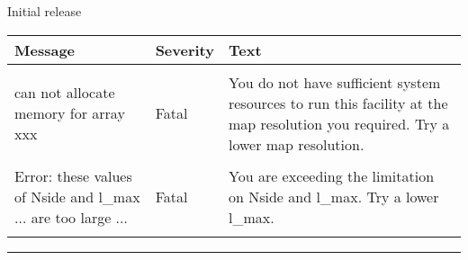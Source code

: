 \begin{release}
  \begin{relist}
    \item Initial release 
  \end{relist}
\end{release}

\begin{messages}
{
\begin{tabular}{p{0.25\hsize} p{0.1\hsize} p{0.35\hsize}} \hline  
  \textbf{Message} & \textbf{Severity} & \textbf{Text} \\ \hline
                   &                   &   \\ %
can not allocate memory for array xxx &  Fatal & You do not have
                   sufficient system resources to run this
                   facility at the map resolution you required. 
  Try a lower map resolution.  \\ 
                   &                   &   \\ %
Error: these values of Nside and l\_max $\ldots$ are too large $\ldots$ &  Fatal & You are exceeding
the limitation on Nside and l\_max. 
  Try a lower l\_max.  \\ 
                   &                   &   \\ \hline %
\end{tabular}
} 
\end{messages}

\rule{\hsize}{2mm}

\newpage
